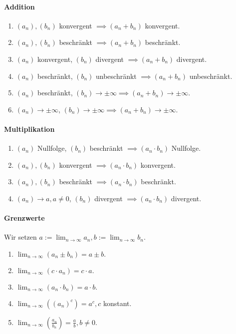 \documentclass[a4paper, 9pt, DIV=24]{scrartcl}
\begin{document}
\paragraph{Addition}
\begin{enumerate}[label={(}\arabic*{)}]
 \item $(a_n), (b_n)$ konvergent $\implies (a_n + b_n)$ konvergent.
 \item $(a_n), (b_n)$ beschränkt $\implies (a_n + b_n)$ beschränkt.
 \item $(a_n)$ konvergent, $(b_n)$ divergent $\implies (a_n + b_n)$ divergent.
 \item $(a_n)$ beschränkt, $(b_n)$ unbeschränkt $\implies (a_n + b_n)$ unbeschränkt.
 \item $(a_n)$ beschränkt, $(b_n) \rightarrow \pm \infty \implies (a_n + b_n) \rightarrow \pm \infty$.
 \item $(a_n) \rightarrow \pm\infty$, $(b_n) \rightarrow \pm\infty \implies (a_n + b_n) \rightarrow \pm\infty$.
\end{enumerate}
\paragraph{Multiplikation}
\begin{enumerate}[label={(}\arabic*{)}]
 \item $(a_n)$ Nullfolge, $(b_n)$ beschränkt $\implies (a_n \cdot b_n)$ Nullfolge.
 \item $(a_n), (b_n)$ konvergent $\implies (a_n \cdot b_n)$ konvergent.
 \item $(a_n), (b_n)$ beschränkt $\implies (a_n \cdot b_n)$ beschränkt.
 \item $(a_n) \rightarrow a, a \neq 0$, $(b_n)$ divergent $\implies (a_n \cdot b_n)$ divergent.
\end{enumerate}
\paragraph{Grenzwerte} Wir setzen $a := \lim_{n\rightarrow\infty} a_n, b := \lim_{n\rightarrow\infty} b_n.$
\begin{enumerate}[label={(}\arabic*{)}]
 \item $\lim_{n\rightarrow\infty}(a_n \pm b_n) = a \pm b.$
 \item $\lim_{n\rightarrow\infty}(c\cdot a_n) = c\cdot a.$
 \item $\lim_{n\rightarrow\infty}(a_n \cdot b_n) = a \cdot b.$
 \item $\lim_{n\rightarrow\infty}((a_n)^c) = a^c, c$ konstant.
 \item $\lim_{n\rightarrow\infty}(\frac{a_n}{b_n}) = \frac{a}{b}, b \neq 0.$
\end{enumerate}
\end{document}
